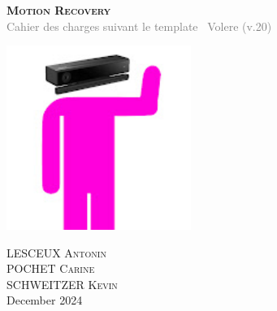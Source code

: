 \begin{titlepage}
    \begin{center}
        \vfill
        \begin{minipage}{0.8\textwidth}
            \centering
            {\Huge \textbf\textsc{{{Motion Recovery}}}}\\ %
            \vspace{4mm}
            {\small \textcolor{gray}{\hfill Cahier des charges suivant le template~\cite{volere20} Volere (v.20)}}
        \end{minipage}
        
        \vspace{15mm}
        \includegraphics[height=6cm]{images/motion-recovery-logo.jpeg} %
        
        \vfill
        
        \begin{minipage}{0.7\textwidth}
            \centering
            \textsc{LESCEUX Antonin}\\
            \vspace{3mm}
            \textsc{POCHET Carine}\\
            \vspace{3mm}
            \textsc{SCHWEITZER Kevin}\\
            \vspace{10mm}
            December 2024
        \end{minipage}
        
        \vfill
    \end{center}
\end{titlepage}